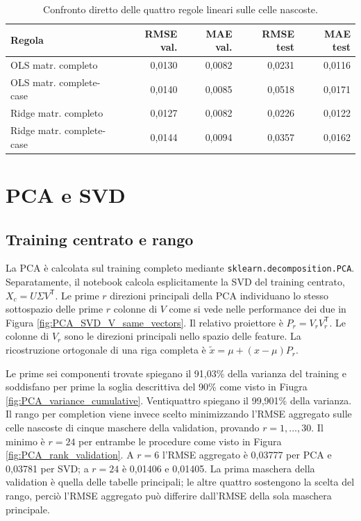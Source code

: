 \documentclass[10pt,a4paper]{article}
\newcommand{\feat}[1]{\texttt{#1}}
\begin{document}
\begin{table}[ht]
\centering\small
\caption{Confronto diretto delle quattro regole lineari sulle celle nascoste.}
\label{tab:linear}
\begin{tabular}{@{}lrrrr@{}}
\toprule
Regola & RMSE val. & MAE val. & RMSE test & MAE test \\
\midrule
OLS matr. completo & 0,0130 & 0,0082 & 0,0231 & 0,0116 \\
OLS matr. complete-case & 0,0140 & 0,0085 & 0,0518 & 0,0171 \\
Ridge matr. completo & 0,0127 & 0,0082 & 0,0226 & 0,0122 \\
Ridge matr. complete-case & 0,0144 & 0,0094 & 0,0357 & 0,0162 \\
\bottomrule
\end{tabular}
\end{table}

\section{PCA e SVD}
\subsection{Training centrato e rango}
La PCA è calcolata sul training completo mediante \feat{sklearn.decomposition.PCA}. Separatamente, 
il notebook calcola esplicitamente la SVD del training centrato, \(X_c=U\Sigma V^{\mathsf T}\). Le prime \(r\) 
direzioni principali della PCA individuano lo stesso sottospazio delle prime \(r\) colonne di \(V\) 
come si vede nelle performance dei due in Figura \ref{fig:PCA_SVD_V_same_vectors}. Il relativo proiettore è \(P_r=V_rV_r^{\mathsf T}\).
Le colonne di $V_r$ sono le direzioni principali nello spazio delle feature. La ricostruzione ortogonale 
di una riga completa è $\widetilde x=\mu+(x-\mu)P_r$.

Le prime sei componenti trovate spiegano il 91,03\% della varianza del training e soddisfano per prime la soglia descrittiva del 90\%
come visto in Fiugra \ref{fig:PCA_variance_cumulative}. Ventiquattro spiegano il 99,901\% della varianza. 
Il rango per completion viene invece scelto minimizzando l'RMSE aggregato sulle celle nascoste di cinque maschere della validation, 
provando $r=1,\ldots,30$. Il minimo è $r=24$ per entrambe le procedure come visto in Figura \ref{fig:PCA_rank_validation}. A $r=6$ l'RMSE aggregato è 0,03777 
per PCA e 0,03781 per SVD; a $r=24$ è 0,01406 e 0,01405. La prima maschera della validation è quella delle tabelle principali; 
le altre quattro sostengono la scelta del rango, perciò l'RMSE aggregato può differire dall'RMSE della sola maschera principale.
\end{document}
